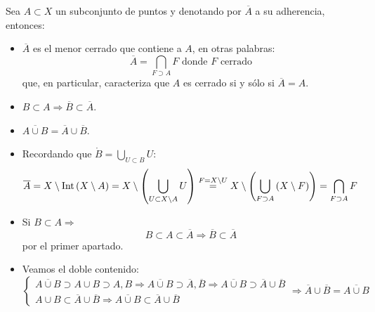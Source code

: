 \begin{prop}
Sea $A\subset X$ un subconjunto de puntos y denotando por $\overline{A}$ a su adherencia, entonces:
\begin{itemize}
\item $\overline{A}$ es el menor cerrado que contiene a $A$, en otras palabras:
$$
\overline{A} = \bigcap_{F \supset A} F \mbox{ donde }F \mbox{ cerrado}
$$
que, en particular, caracteriza que $A$ es cerrado si y sólo si $\overline{A} = A$.

\item $B \subset A \Rightarrow \overline{B} \subset \overline{A}$.
\item $\overline{A \cup B} = \overline{A} \cup \overline{B}$.
\end{itemize}
\end{prop}
\begin{demo}
\begin{itemize}
\item Recordando que $\mathring{B} = \bigcup_{U \subset B} U$:
$$
\overline{A} = X \setminus \operatorname{Int}\left( X \setminus A \right) = X \setminus \left(\bigcup_{U \subset X \setminus A} U \right) \stackrel{F = X \setminus U}{=} X \setminus \left(\bigcup_{F \supset A} \left( X \setminus F \right) \right) = \bigcap_{F \supset A} F
$$
\item Si $B \subset A \Rightarrow$
$$
B \subset A \subset \overline{A} \Rightarrow \overline{B} \subset \overline{A}
$$
por el primer apartado.
\item Veamos el doble contenido:
$$
\begin{cases}
	\overline{A\cup B} \supset A \cup B \supset
		A,B \Rightarrow \overline{A\cup B} \supset
		\overline{A}, \overline{B} \Rightarrow \overline{A\cup B} \supset \overline{A} \cup \overline{B} \\
	A \cup B \subset \overline{A} \cup \overline{B} \Rightarrow \overline{A\cup B} \subset \overline{A} \cup \overline{B}
\end{cases} \Rightarrow \overline{A}\cup \overline{B} = \overline{A\cup B}
$$
\end{itemize}
\end{demo}

